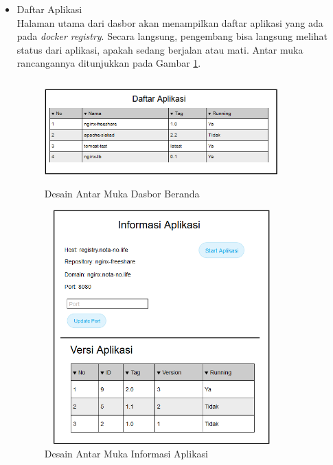             \begin{itemize}
            \item Daftar Aplikasi \\
            	Halaman utama dari dasbor akan menampilkan daftar aplikasi yang ada pada \textit{docker registry}. Secara langsung, pengembang bisa langsung melihat status dari aplikasi, apakah sedang berjalan atau mati. Antar muka rancangannya ditunjukkan pada Gambar \ref{desain:dasborberanda}.
                
        	\begin{figure}[H]
				\centering
				\includegraphics[width=9cm,height=4cm]{Images/C-3/beranda.png}
				\caption{Desain Antar Muka Dasbor Beranda}
				\label{desain:dasborberanda}
			\end{figure}
                
            \begin{figure}[H]
				\centering
				\includegraphics[width=9cm,height=9cm]{Images/C-3/image.png}
				\caption{Desain Antar Muka Informasi Aplikasi}
				\label{desain:dasborimage}
			\end{figure}
            

\end{itemize}
